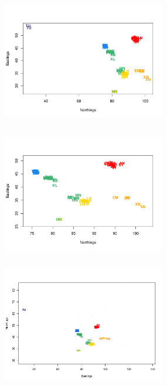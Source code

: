 \documentclass[12pt]{article}
\newcommand{\gb}[1]{{\it\color{magenta}{(#1)}}}
\begin{document}
\begin{figure}
	\centering
			{\includegraphics[width=2.8in,height=2.3in]{figs/warblers/warb_ind_noad.pdf}}
			{\includegraphics[width=2.8in,height=2.3in]{figs/warblers/warb_ind_noad_closeup.pdf}}
			{\includegraphics[width=2.8in,height=2.3in]{figs/warblers/individual_warbler_map_arrows_randpr1.png}}

\end{figure}
\end{document}
